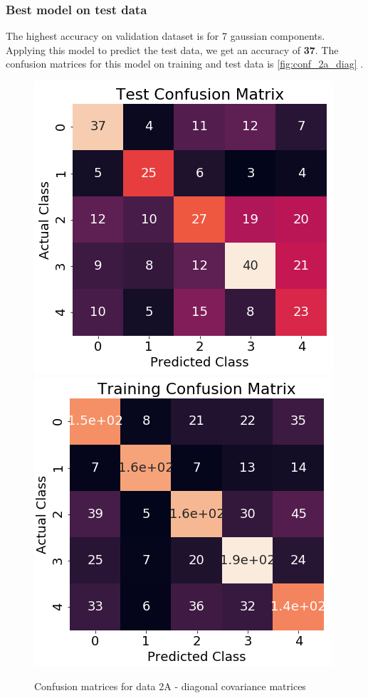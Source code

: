 \documentclass[11pt,a4paper]{article}
\begin{document}
\subsubsection{Best model on test data}
The highest accuracy on validation dataset is for 7 gaussian components. Applying this model to predict the test data, we get an accuracy of \textbf{37}. The confusion matrices for this model on training and test data is \autoref{fig:conf_2a_diag} .
\begin{figure}[H]
    \centering
    \includegraphics[scale=0.5]{images/conf_test2a.png}
    \includegraphics[scale=0.5]{images/conf_train2a.png}
    \caption{Confusion matrices for data 2A - diagonal covariance matrices}
    \label{fig:conf_2a_diag}
\end{figure}
\end{document}

